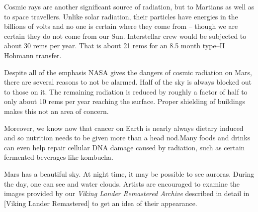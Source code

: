 Cosmic rays are another significant source of radiation, but to Martians as well as to space travellers. Unlike solar radiation, their particles have energies in the billions of volts and no one is certain where they come from -- though we are certain they do not come from our Sun. Interstellar crew would be subjected to about 30 rems per year. That is about 21 rems for an 8.5 month type--II Hohmann transfer.

Despite all of the emphasis NASA gives the dangers of cosmic radiation on Mars, there are several reasons to not be alarmed. Half of the sky is always blocked out to those on it. The remaining radiation is reduced by roughly a factor of half to only about 10 rems per year reaching the surface. Proper shielding of buildings makes this not an area of concern. 

Moreover, we know now that cancer on Earth is nearly always dietary induced and so nutrition needs to be given more than a head nod. Many foods and drinks can even help repair cellular DNA damage caused by radiation, such as certain fermented beverages like kombucha.\footnotecite[cavusoglu2009]

Mars has a beautiful sky. At night time, it may be possible to see auroras. During the day, one can see  and water clouds. Artists are encouraged to examine the images provided by our {\it Viking Lander Remastered Archive} described in detail in [Viking Lander Remastered] to get an idea of their appearance.

